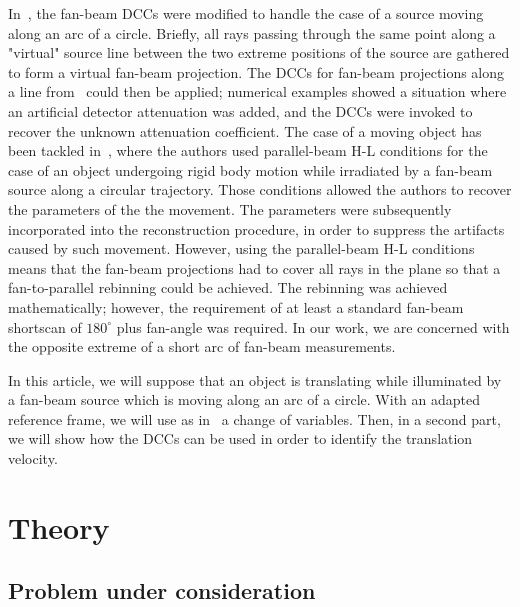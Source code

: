 \documentclass[twocolumn]{IEEEtran}
\begin{document}
In~\cite{clackdoyle2015consistency}, the fan-beam DCCs were modified to handle the case of a source moving along an arc of a circle. Briefly, all rays passing through the same point along a "virtual" source line between the two extreme positions of the source are gathered to form a virtual fan-beam projection. The DCCs for fan-beam projections along a line from~\cite{clackdoyle2013necessary} could then be applied; numerical examples showed a situation where an artificial detector attenuation was added, and the DCCs were invoked to recover the unknown attenuation coefficient. The case of a moving object has been tackled in~\cite{yu2006data,yu2007data}, where the authors used parallel-beam H-L conditions for the case of an object undergoing rigid body motion while irradiated by a fan-beam source along a circular trajectory. Those conditions allowed the authors to recover the parameters of the the movement. The parameters were subsequently incorporated into the reconstruction procedure, in order to suppress the artifacts caused by such movement.  However, using the parallel-beam H-L conditions means that the fan-beam projections had to cover all rays in the plane so that a fan-to-parallel rebinning could be achieved. The rebinning was achieved mathematically; however, the requirement of at least a standard fan-beam shortscan of $180^{\circ}$ plus fan-angle was required. In our work, we are concerned with the opposite extreme of a short arc of fan-beam measurements.

In this article, we will suppose that an object is translating while illuminated by a fan-beam source which is moving along an arc of a circle. With an adapted reference frame, we will use as in~\cite{clackdoyle2015consistency} a change of variables. Then, in a second part, we will show how the DCCs can be used in order to identify the translation velocity.

\section{Theory} 
\label{sec:theory}

\subsection{Problem under consideration}
\label{sub:problem_under_consideration}
\end{document}
